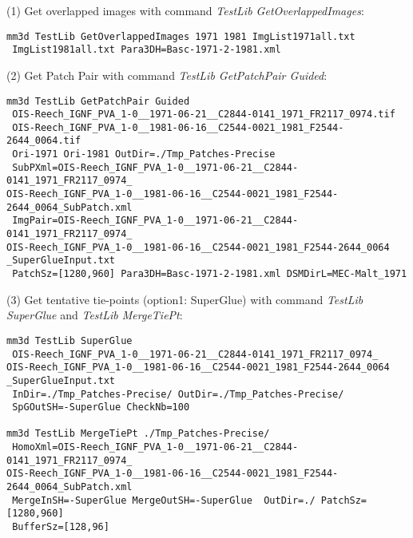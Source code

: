 \begin{enumerate}
(1) Get overlapped images with command \textit{TestLib GetOverlappedImages}:\\
\begin{verbatim}
mm3d TestLib GetOverlappedImages 1971 1981 ImgList1971all.txt
 ImgList1981all.txt Para3DH=Basc-1971-2-1981.xml
\end{verbatim}
(2) Get Patch Pair with command \textit{TestLib GetPatchPair Guided}:\\
\begin{verbatim}
mm3d TestLib GetPatchPair Guided
 OIS-Reech_IGNF_PVA_1-0__1971-06-21__C2844-0141_1971_FR2117_0974.tif 
 OIS-Reech_IGNF_PVA_1-0__1981-06-16__C2544-0021_1981_F2544-2644_0064.tif 
 Ori-1971 Ori-1981 OutDir=./Tmp_Patches-Precise 
 SubPXml=OIS-Reech_IGNF_PVA_1-0__1971-06-21__C2844-0141_1971_FR2117_0974_
OIS-Reech_IGNF_PVA_1-0__1981-06-16__C2544-0021_1981_F2544-2644_0064_SubPatch.xml 
 ImgPair=OIS-Reech_IGNF_PVA_1-0__1971-06-21__C2844-0141_1971_FR2117_0974_
OIS-Reech_IGNF_PVA_1-0__1981-06-16__C2544-0021_1981_F2544-2644_0064
_SuperGlueInput.txt
 PatchSz=[1280,960] Para3DH=Basc-1971-2-1981.xml DSMDirL=MEC-Malt_1971
\end{verbatim}

(3) Get tentative tie-points (option1: SuperGlue) with command \textit{TestLib SuperGlue} and \textit{TestLib MergeTiePt}:\\
\begin{verbatim}
mm3d TestLib SuperGlue
 OIS-Reech_IGNF_PVA_1-0__1971-06-21__C2844-0141_1971_FR2117_0974_
OIS-Reech_IGNF_PVA_1-0__1981-06-16__C2544-0021_1981_F2544-2644_0064
_SuperGlueInput.txt  
 InDir=./Tmp_Patches-Precise/ OutDir=./Tmp_Patches-Precise/ 
 SpGOutSH=-SuperGlue CheckNb=100

mm3d TestLib MergeTiePt ./Tmp_Patches-Precise/ 
 HomoXml=OIS-Reech_IGNF_PVA_1-0__1971-06-21__C2844-0141_1971_FR2117_0974_
OIS-Reech_IGNF_PVA_1-0__1981-06-16__C2544-0021_1981_F2544-2644_0064_SubPatch.xml 
 MergeInSH=-SuperGlue MergeOutSH=-SuperGlue  OutDir=./ PatchSz=[1280,960] 
 BufferSz=[128,96]
\end{verbatim}


\end{enumerate}
